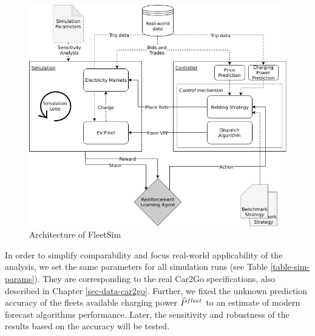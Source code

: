 \documentclass[a4paper, 12pt]{article}
\begin{document}
\begin{figure}[hp]
\centering
\includegraphics[width=1\linewidth]{./fig/simulation_platform.png}
\caption[FleetSim Architecture]{Architecture of FleetSim \label{fig-fleetsim}}
\end{figure}

In order to simplify comparability and focus real-world applicability of the
analysis, we set the same parameters for all simulation runs (see Table
\ref{table-sim-params}). They are corresponding to the real Car2Go specifications,
also described in Chapter \ref{sec-data-car2go}. Further, we fixed the unknown
prediction accuracy of the fleets available charging power \(\widehat{P}^{fleet}_{}\) to an
estimate of modern forecast algorithms performance. Later, the sensitivity and
robustness of the results based on the accuracy will be tested.
\end{document}
